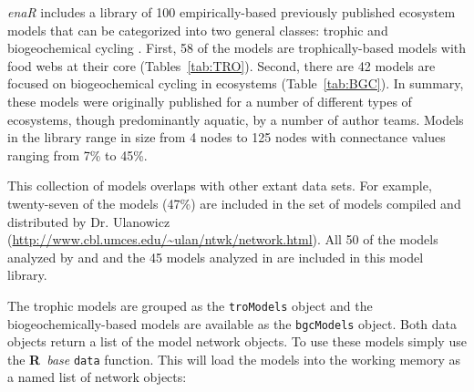 \documentclass[article]{jss}
\newcommand{\R}{\textbf{R}}
\begin{document}
\textit{enaR} includes a library of 100 empirically-based previously
published ecosystem models that can be categorized into two general
classes: trophic and biogeochemical cycling \citep{christian96,
  baird08_sylt, borrett10_idd, borrett15_bgc}.  First, 58 of the
models are trophically-based models with food webs at their core
(Tables~\ref{tab:TRO}).  Second, there are 42 models are focused on
biogeochemical cycling in ecosystems (Table~\ref{tab:BGC}).  In
summary, these models were originally published for a number of
different types of ecosystems, though predominantly aquatic, by a
number of author teams.  Models in the library range in size from 4
nodes to 125 nodes with connectance values ranging from 7\% to 45\%.

This collection of models overlaps with other extant data sets.  For
example, twenty-seven of the models (47\%) are included in the set of
models compiled and distributed by Dr. Ulanowicz
(\url{http://www.cbl.umces.edu/~ulan/ntwk/network.html}).  All 50 of
the models analyzed by \citet{borrett10_hmg} and \citet{salas11_did}
and the 45 models analyzed in \citet{borrett13} are included in this
model library.

The trophic models are grouped as the \texttt{troModels} object and
the biogeochemically-based models are available as the
\texttt{bgcModels} object.  Both data objects return a list of the
model network objects.  To use these models simply use the \R\
\textit{base} \texttt{data} function. This will load the models into
the working memory as a named list of network objects:
\end{document}
